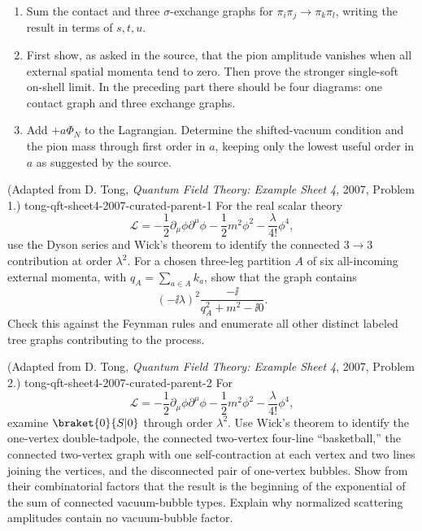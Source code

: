 \begin{enumerate}
\begin{enumerate}
two-pion state.  Evaluate the lifetime for \(N=3\), \(\lambda=0.1\),
and \(\mu=10\,\mathrm{GeV}\).
\item Sum the contact and three \(\sigma\)-exchange graphs for
\(\pi_i\pi_j\to\pi_k\pi_l\), writing the result in terms of \(s,t,u\).
\item First show, as asked in the source, that the pion amplitude vanishes
when all external spatial momenta tend to zero.  Then prove the stronger
single-soft on-shell limit.  In the preceding part there should be four
diagrams: one contact graph and three exchange graphs.
\item Add \(+a\Phi_N\) to the Lagrangian.  Determine the shifted-vacuum
condition and the pion mass through first order in \(a\), keeping only
the lowest useful order in \(a\) as suggested by the source.
\end{enumerate}

  {(Adapted from D. Tong, \emph{Quantum Field Theory: Example Sheet 4}, 2007, Problem 1.)}
  {tong-qft-sheet4-2007-curated-parent-1}
For the real scalar theory
\[
 \mathcal L=-\frac12\partial_\mu\phi\partial^\mu\phi
 -\frac12m^2\phi^2-\frac{\lambda}{4!}\phi^4,
\]
use the Dyson series and Wick's theorem to identify the connected
\(3\to3\) contribution at order \(\lambda^2\).  For a chosen three-leg
partition \(A\) of six all-incoming external momenta, with
\(q_A=\sum_{a\in A}k_a\), show that the graph contains
\[
 (-\ii\lambda)^2\frac{-\ii}{q_A^2+m^2-\ii0}.
\]
Check this against the Feynman rules and enumerate all other distinct
labeled tree graphs contributing to the process.

  {(Adapted from D. Tong, \emph{Quantum Field Theory: Example Sheet 4}, 2007, Problem 2.)}
  {tong-qft-sheet4-2007-curated-parent-2}
For
\[
 \mathcal L=-\frac12\partial_\mu\phi\partial^\mu\phi
 -\frac12m^2\phi^2-\frac{\lambda}{4!}\phi^4,
\]
examine
\(\braket{0}{S|0}\) through order \(\lambda^2\).  Use Wick's theorem to
identify the one-vertex double-tadpole, the connected two-vertex
four-line ``basketball,'' the connected two-vertex graph with one
self-contraction at each vertex and two lines joining the vertices, and
the disconnected pair of one-vertex bubbles.  Show from their
combinatorial factors that the result is the beginning of the exponential
of the sum of connected vacuum-bubble types.  Explain why normalized
scattering amplitudes contain no vacuum-bubble factor.


\end{enumerate}
